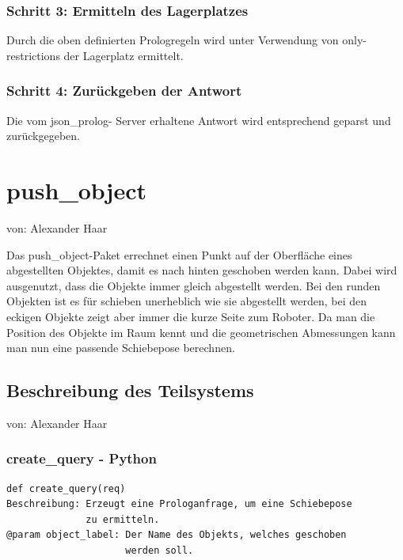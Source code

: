 \documentclass{suturo}
\makeatletter
\newcommand{\chapterauthor}[1]{%
  {\parindent0pt\vspace*{-27pt}%
  \linespread{0}\small\begin{flushright}von: #1\end{flushright}%
  \par\nobreak\vspace*{0pt}}
  \@afterheading%
}
\makeatother
\begin{document}
\subsubsection{Schritt 3: Ermitteln des Lagerplatzes} 
Durch die oben definierten Prologregeln wird unter Verwendung von only- restrictions der Lagerplatz ermittelt.
\subsubsection{Schritt 4: Zurückgeben der Antwort}
Die vom json\_prolog- Server erhaltene Antwort wird entsprechend geparst und zurückgegeben.

\section{push\_object}
\chapterauthor{Alexander Haar}
Das push\_object-Paket errechnet einen Punkt auf der Oberfläche eines abgestellten Objektes, damit es nach hinten geschoben werden kann. Dabei wird ausgenutzt, dass die Objekte immer gleich abgestellt werden. Bei den runden Objekten ist es für schieben unerheblich wie sie abgestellt werden, bei den eckigen Objekte zeigt aber immer die kurze Seite zum Roboter. Da man die Position des Objekte im Raum kennt und die geometrischen Abmessungen kann man nun eine passende Schiebepose berechnen.

\begin{figure}[!htb]
\end{figure}
      
\subsection{Beschreibung des Teilsystems}
\chapterauthor{Alexander Haar}

\subsubsection{create\_query - Python}
\begin{verbatim}
def create_query(req)
Beschreibung: Erzeugt eine Prologanfrage, um eine Schiebepose 
              zu ermitteln.
@param object_label: Der Name des Objekts, welches geschoben
                     werden soll.
\end{verbatim}
\end{document}
